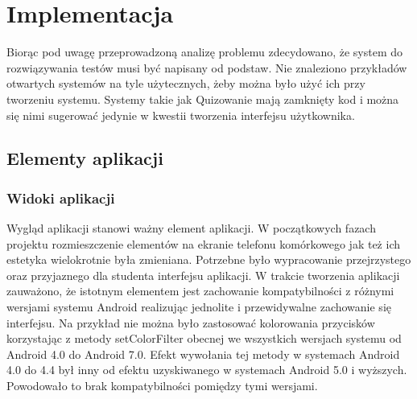 \documentclass{report}
\begin{document}
	\chapter{Implementacja}
	
	Biorąc pod uwagę przeprowadzoną analizę problemu zdecydowano, że system do rozwiązywania testów musi być napisany od podstaw. Nie znaleziono przykładów otwartych systemów na tyle użytecznych, żeby można było użyć ich przy tworzeniu systemu. Systemy takie jak Quizowanie mają zamknięty kod i można się nimi sugerować jedynie w kwestii tworzenia interfejsu użytkownika.
	
		\section{Elementy aplikacji}
	
			\subsection{Widoki aplikacji}
		
			Wygląd aplikacji stanowi ważny element aplikacji. W początkowych fazach projektu rozmieszczenie elementów na ekranie telefonu komórkowego jak też ich estetyka wielokrotnie była zmieniana. Potrzebne było wypracowanie przejrzystego oraz przyjaznego dla studenta interfejsu aplikacji. W trakcie tworzenia aplikacji zauważono, że istotnym elementem jest zachowanie kompatybilności z różnymi wersjami systemu Android realizując jednolite i przewidywalne zachowanie się interfejsu.
			Na przykład nie można było zastosować kolorowania przycisków korzystając z metody setColorFilter obecnej we wszystkich wersjach systemu od Android 4.0 do Android 7.0. Efekt wywołania tej metody w systemach Android 4.0 do 4.4 był inny od efektu uzyskiwanego w systemach Android 5.0 i wyższych. Powodowało to brak kompatybilności pomiędzy tymi wersjami.\\
		
\end{document}
